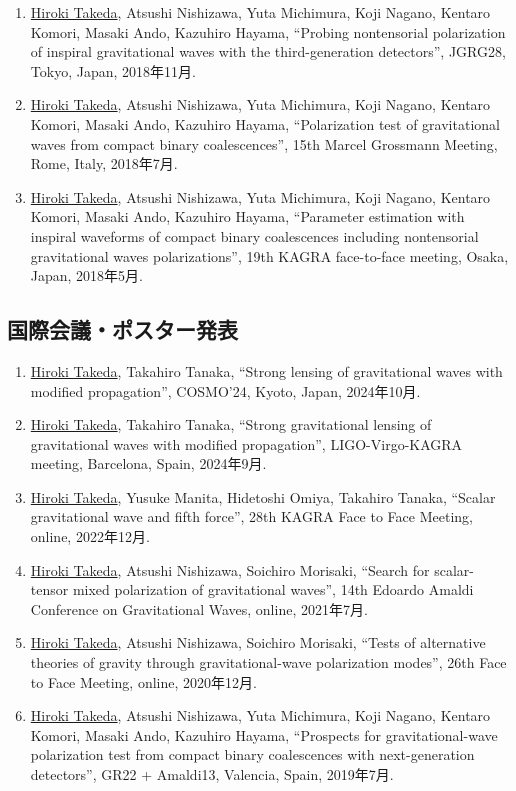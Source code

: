 \documentclass[uplatex, 11pt]{jsarticle}
\begin{document}
\begin{enumerate}
\item \uline{Hiroki Takeda}, Atsushi Nishizawa, Yuta Michimura, Koji Nagano, Kentaro Komori, Masaki Ando, Kazuhiro Hayama, “Probing nontensorial polarization of inspiral gravitational waves with the third-generation detectors”, JGRG28, Tokyo, Japan, 2018年11月.
\item \uline{Hiroki Takeda}, Atsushi Nishizawa, Yuta Michimura, Koji Nagano, Kentaro Komori, Masaki Ando, Kazuhiro Hayama, “Polarization test of gravitational waves from compact binary coalescences”, 15th Marcel Grossmann Meeting, Rome, Italy, 2018年7月.
\item \uline{Hiroki Takeda}, Atsushi Nishizawa, Yuta Michimura, Koji Nagano, Kentaro Komori, Masaki Ando, Kazuhiro Hayama, “Parameter estimation with inspiral waveforms of compact binary coalescences including nontensorial gravitational waves polarizations”, 19th KAGRA face-to-face meeting, Osaka, Japan, 2018年5月.
\end{enumerate}
\subsection*{国際会議・ポスター発表}
\begin{enumerate}
\item \uline{Hiroki Takeda}, Takahiro Tanaka, “Strong lensing of gravitational waves with modified propagation”, COSMO'24, Kyoto, Japan, 2024年10月.
\item \uline{Hiroki Takeda}, Takahiro Tanaka, “Strong gravitational lensing of gravitational waves with modified propagation”, LIGO-Virgo-KAGRA meeting, Barcelona, Spain, 2024年9月.
\item \uline{Hiroki Takeda}, Yusuke Manita, Hidetoshi Omiya, Takahiro Tanaka, “Scalar gravitational wave and fifth force”, 28th KAGRA Face to Face Meeting, online, 2022年12月.
\item \uline{Hiroki Takeda}, Atsushi Nishizawa, Soichiro Morisaki, “Search for scalar-tensor mixed polarization of gravitational waves”, 14th Edoardo Amaldi Conference on Gravitational Waves, online, 2021年7月.
\item \uline{Hiroki Takeda}, Atsushi Nishizawa, Soichiro Morisaki, “Tests of alternative theories of gravity through gravitational-wave polarization modes”, 26th Face to Face Meeting, online, 2020年12月.
\item \uline{Hiroki Takeda}, Atsushi Nishizawa, Yuta Michimura, Koji Nagano, Kentaro Komori, Masaki Ando, Kazuhiro Hayama, “Prospects for gravitational-wave polarization test from compact binary coalescences with next-generation detectors”, GR22 + Amaldi13, Valencia, Spain, 2019年7月.
\end{enumerate}
\end{document}
